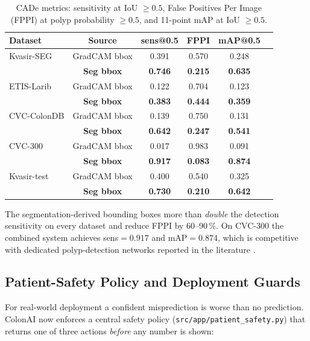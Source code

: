 \documentclass[conference]{IEEEtran}
\begin{document}
\begin{table}[h]
\centering\small
\caption{CADe metrics: sensitivity at IoU $\geq 0.5$, False Positives
         Per Image (FPPI) at polyp probability $\geq 0.5$, and 11-point
         mAP at IoU $\geq 0.5$.}
\label{tab:cade}
\begin{tabular}{lccccc}
\hline
\textbf{Dataset} & \textbf{Source} & \textbf{sens@0.5} & \textbf{FPPI} & \textbf{mAP@0.5} \\
\hline
Kvasir-SEG   & GradCAM bbox     & 0.391 & 0.570 & 0.248 \\
             & \textbf{Seg bbox} & \textbf{0.746} & \textbf{0.215} & \textbf{0.635} \\
\hline
ETIS-Larib   & GradCAM bbox     & 0.122 & 0.704 & 0.123 \\
             & \textbf{Seg bbox} & \textbf{0.383} & \textbf{0.444} & \textbf{0.359} \\
\hline
CVC-ColonDB  & GradCAM bbox     & 0.139 & 0.750 & 0.131 \\
             & \textbf{Seg bbox} & \textbf{0.642} & \textbf{0.247} & \textbf{0.541} \\
\hline
CVC-300      & GradCAM bbox     & 0.017 & 0.983 & 0.091 \\
             & \textbf{Seg bbox} & \textbf{0.917} & \textbf{0.083} & \textbf{0.874} \\
\hline
Kvasir-test  & GradCAM bbox     & 0.400 & 0.540 & 0.325 \\
             & \textbf{Seg bbox} & \textbf{0.730} & \textbf{0.210} & \textbf{0.642} \\
\hline
\end{tabular}
\end{table}

The segmentation-derived bounding boxes more than \emph{double} the
detection sensitivity on every dataset and reduce FPPI by 60--90\,\%.
On CVC-300 the combined system achieves sens$=0.917$ and mAP$=0.874$,
which is competitive with dedicated polyp-detection networks reported
in the literature \cite{wang2018}.

\subsection{Patient-Safety Policy and Deployment Guards}

For real-world deployment a confident misprediction is worse than no
prediction. ColonAI now enforces a central safety policy
(\texttt{src/app/patient\_safety.py}) that returns one of three actions
\emph{before} any number is shown:
\end{document}
